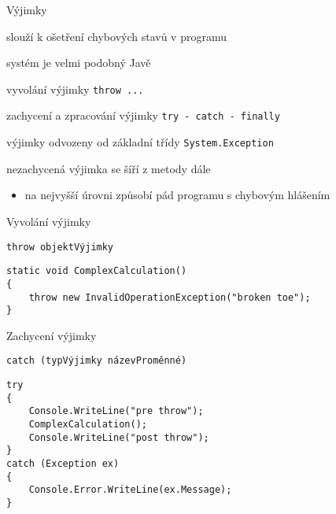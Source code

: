 

\begin{frame}[fragile]

\begin{bitemize}{Výjimky}
\item slouží k ošetření chybových stavů v programu
\item systém je velmi podobný Javě
\item[]
\item vyvolání výjimky \lstinline|throw ...|
\item zachycení a zpracování výjimky \lstinline|try - catch - finally|
\item výjimky odvozeny od základní třídy \lstinline|System.Exception|
\item[]
\item nezachycená výjimka se šíří z metody dále
\begin{itemize}
\item na nejvyšší úrovni způsobí pád programu s chybovým hlášením
\end{itemize}

\end{bitemize}

\end{frame}




\begin{frame}[fragile]
\vfill
\begin{bitemize}{Vyvolání výjimky}
\item \lstinline|throw objektVýjimky|
\end{bitemize}
\vfill
\begin{yesblock}
\begin{lstlisting}
static void ComplexCalculation()
{
    throw new InvalidOperationException("broken toe");
}
\end{lstlisting}
\end{yesblock}
\vfill
\end{frame}



\begin{frame}[fragile]
\begin{bitemize}{Zachycení výjimky}
\item \lstinline|catch (typVýjimky názevProměnné)|
\end{bitemize}
\vfill
\begin{yesblock}
\begin{lstlisting}
try
{
    Console.WriteLine("pre throw");
    ComplexCalculation();
    Console.WriteLine("post throw");
}
catch (Exception ex)
{
    Console.Error.WriteLine(ex.Message);
}
\end{lstlisting}
\end{yesblock}
\end{frame}



